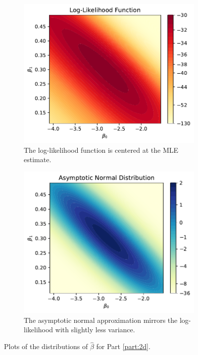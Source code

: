 \documentclass[letterpaper,11pt]{article}
\begin{document}
\begin{enumerate}
\begin{enumerate}
\begin{description}
      \begin{figure}
        \begin{subfigure}[b]{\textwidth}
          \centering
          \includegraphics{p2_log_likelihood.pdf}
          \caption{The log-likelihood function is centered at the MLE estimate.}
          \label{fig:p2_log_likelihood}
        \end{subfigure}
        \begin{subfigure}[b]{\textwidth}
          \centering
          \includegraphics{p2_asymptotic_normal.pdf}
          \caption{The asymptotic normal approximation mirrors the
            log-likelihood with slightly less variance.}
          \label{fig:p2_asymptotic_normal}
        \end{subfigure}
        \caption{Plots of the distributions of $\hat{\beta}$ for Part
          \ref{part:2d}.}
        \label{fig:p2_beta_hat_likelihood}
      \end{figure}      
    \end{description}
    

\end{enumerate}
\end{enumerate}
\end{document}
